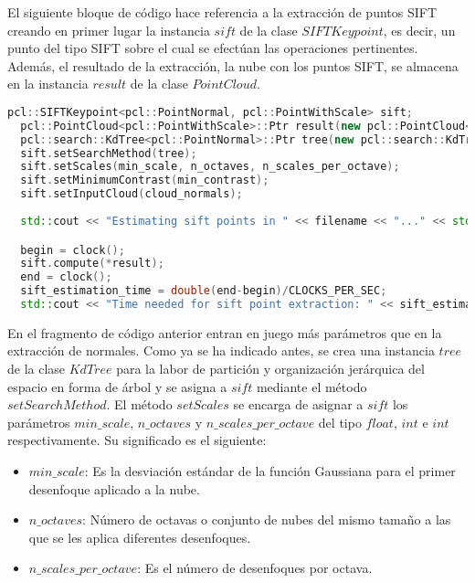 El siguiente bloque de código hace referencia a la extracción de puntos SIFT creando en primer lugar la instancia $sift$ de la clase $SIFTKeypoint$, es decir, un punto del tipo SIFT sobre el cual se efectúan las operaciones pertinentes. Además, el resultado de la extracción, la nube con los puntos SIFT, se almacena en la instancia $result$ de la clase $PointCloud$.

\begin{lstlisting}[language=C++,breaklines]
  pcl::SIFTKeypoint<pcl::PointNormal, pcl::PointWithScale> sift;
  pcl::PointCloud<pcl::PointWithScale>::Ptr result(new pcl::PointCloud<pcl::PointWithScale>);
  pcl::search::KdTree<pcl::PointNormal>::Ptr tree(new pcl::search::KdTree<pcl::PointNormal> ());
  sift.setSearchMethod(tree);
  sift.setScales(min_scale, n_octaves, n_scales_per_octave);
  sift.setMinimumContrast(min_contrast);
  sift.setInputCloud(cloud_normals);
 
  std::cout << "Estimating sift points in " << filename << "..." << std::endl;

  begin = clock();
  sift.compute(*result);
  end = clock();
  sift_estimation_time = double(end-begin)/CLOCKS_PER_SEC;
  std::cout << "Time needed for sift point extraction: " << sift_estimation_time << " seconds" << std::endl << std::endl;
\end{lstlisting}


En el fragmento de código anterior entran en juego más parámetros que en la extracción de normales. Como ya se ha indicado antes, se crea una instancia $tree$ de la clase $KdTree$\cite{kdtree} para la labor de partición y organización jerárquica del espacio en forma de árbol y se asigna a $sift$ mediante el método $setSearchMethod$.
El método $setScales$ se encarga de asignar a $sift$ los parámetros $min\_scale$, $n\_octaves$ y $n\_scales\_per\_octave$ del tipo $float$, $int$ e $int$ respectivamente. Su significado es el siguiente:

\begin{itemize}
\item[•]$min\_scale$: Es la desviación estándar de la función Gaussiana para el primer desenfoque aplicado a la nube.
\item[•]$n\_octaves$: Número de octavas o conjunto de nubes del mismo tamaño a las que se les aplica diferentes desenfoques.
\item[•]$n\_scales\_per\_octave$: Es el número de desenfoques por octava.
\end{itemize}

